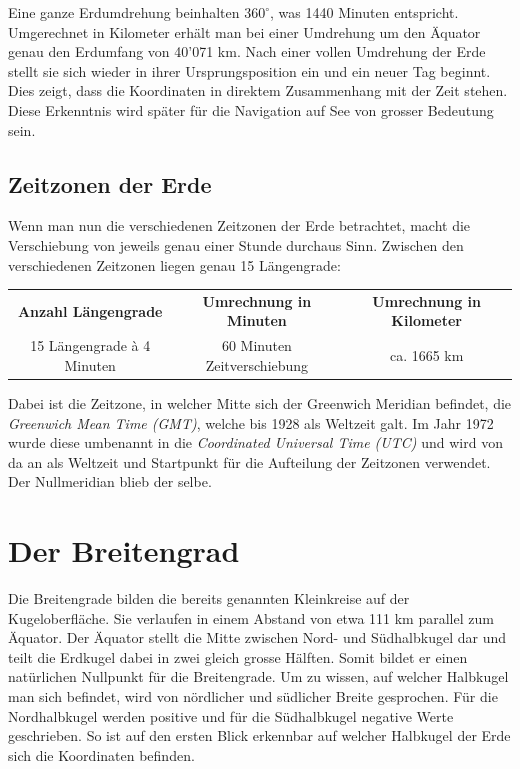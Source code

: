 \begin{refsection}
Eine ganze Erdumdrehung beinhalten $360 ^{\circ}$, was 1440 Minuten entspricht. Umgerechnet in Kilometer erhält man bei einer Umdrehung um den Äquator genau den Erdumfang von 40’071 km.
Nach einer vollen Umdrehung der Erde stellt sie sich wieder in ihrer Ursprungsposition ein und ein neuer Tag beginnt. Dies zeigt, dass die Koordinaten in direktem Zusammenhang mit der Zeit stehen. Diese Erkenntnis wird später für die Navigation auf See von grosser Bedeutung sein.


\subsection{Zeitzonen der Erde} \label{Zeitzonen} 
Wenn man nun die verschiedenen Zeitzonen der Erde betrachtet, macht die Verschiebung von jeweils genau einer Stunde durchaus Sinn.
Zwischen den verschiedenen Zeitzonen liegen genau 15 Längengrade:
\begin{center}
\renewcommand{\arraystretch}{1.5}
\begin{tabular}{ccc}
\textbf{Anzahl Längengrade} & \textbf{Umrechnung in Minuten} & \textbf{Umrechnung in Kilometer}  \\
15 Längengrade à 4 Minuten & 60 Minuten Zeitverschiebung & ca. 1665 km \\
\end{tabular}
\end{center}


Dabei ist die Zeitzone, in welcher Mitte sich der Greenwich Meridian befindet, die \textit{Greenwich Mean Time (GMT)}, welche bis 1928 als Weltzeit galt. Im Jahr 1972 wurde diese umbenannt in die \textit{Coordinated Universal Time (UTC)} und wird von da an als Weltzeit und Startpunkt für die Aufteilung der Zeitzonen verwendet. Der Nullmeridian blieb der selbe.


\section{Der Breitengrad}
Die Breitengrade bilden die bereits genannten Kleinkreise auf der Kugeloberfläche. Sie verlaufen in einem Abstand von etwa 111 km parallel zum Äquator. Der Äquator stellt die Mitte zwischen Nord- und Südhalbkugel dar und teilt die Erdkugel dabei in zwei gleich grosse Hälften. Somit bildet er einen natürlichen Nullpunkt für die Breitengrade.
Um zu wissen, auf welcher Halbkugel man sich befindet, wird von nördlicher und südlicher Breite gesprochen. Für die Nordhalbkugel werden positive und für die Südhalbkugel negative Werte geschrieben. So ist auf den ersten Blick erkennbar auf welcher Halbkugel der Erde sich die Koordinaten befinden.


\end{refsection}
